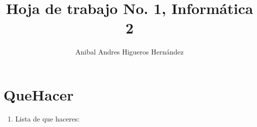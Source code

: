 \documentclass{article}
\begin{document}
    \usepackage{color}

        \title{Hoja de trabajo No. 1, Informática 2}
        \author{Anibal Andres Higueros Hernández}
        \maketitle
        
        \section{QueHacer}
        \begin{enumerate}
            \item Lista de que haceres:
        \end{enumerate}
    
\end{document}
